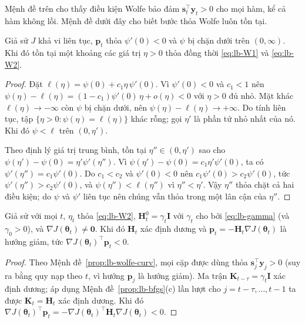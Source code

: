 Mệnh đề trên cho thấy điều kiện Wolfe bảo đảm $\mathbf{s}_t^{\top}\mathbf{y}_t>0$ cho mọi hàm, kể cả hàm không lồi. Mệnh đề dưới đây cho biết bước thỏa Wolfe luôn tồn tại.

\begin{proposition}\label{prop:lb-wolfe-exist}
Giả sử $J$ khả vi liên tục, $\mathbf{p}_t$ thỏa $\psi'(0)<0$ và $\psi$ bị chặn dưới trên $(0,\infty)$. Khi đó tồn tại một khoảng các giá trị $\eta>0$ thỏa đồng thời \eqref{eq:lb-W1} và \eqref{eq:lb-W2}.
\end{proposition}

\begin{proof}
Đặt $\ell(\eta)=\psi(0)+c_1\eta\,\psi'(0)$. Vì $\psi'(0)<0$ và $c_1<1$ nên $\psi(\eta)-\ell(\eta)=(1-c_1)\psi'(0)\,\eta+o(\eta)<0$ với $\eta>0$ đủ nhỏ. Mặt khác $\ell(\eta)\to-\infty$ còn $\psi$ bị chặn dưới, nên $\psi(\eta)-\ell(\eta)\to+\infty$. Do tính liên tục, tập $\{\eta>0:\psi(\eta)=\ell(\eta)\}$ khác rỗng; gọi $\eta'$ là phần tử nhỏ nhất của nó. Khi đó $\psi<\ell$ trên $(0,\eta')$.

Theo định lý giá trị trung bình, tồn tại $\eta''\in(0,\eta')$ sao cho $\psi(\eta')-\psi(0)=\eta'\psi'(\eta'')$. Vì $\psi(\eta')-\psi(0)=c_1\eta'\psi'(0)$, ta có $\psi'(\eta'')=c_1\psi'(0)$. Do $c_1<c_2$ và $\psi'(0)<0$ nên $c_1\psi'(0)>c_2\psi'(0)$, tức $\psi'(\eta'')>c_2\psi'(0)$, và $\psi(\eta'')<\ell(\eta'')$ vì $\eta''<\eta'$. Vậy $\eta''$ thỏa chặt cả hai điều kiện; do $\psi$ và $\psi'$ liên tục nên chúng vẫn thỏa trong một lân cận của $\eta''$.
\end{proof}

\begin{proposition}\label{prop:lb-descent}
Giả sử với mọi $t$, $\eta_t$ thỏa \eqref{eq:lb-W2}, $\mathbf{H}_t^{0}=\gamma_t\mathbf{I}$ với $\gamma_t$ cho bởi \eqref{eq:lb-gamma} (và $\gamma_0>0$), và $\nabla J(\boldsymbol{\theta}_t)\neq\mathbf{0}$. Khi đó $\mathbf{H}_t$ xác định dương và $\mathbf{p}_t=-\mathbf{H}_t\nabla J(\boldsymbol{\theta}_t)$ là hướng giảm, tức $\nabla J(\boldsymbol{\theta}_t)^{\top}\mathbf{p}_t<0$.
\end{proposition}

\begin{proof}
Theo Mệnh đề~\ref{prop:lb-wolfe-curv}, mọi cặp được dùng thỏa $\mathbf{s}_j^{\top}\mathbf{y}_j>0$ (suy ra bằng quy nạp theo $t$, vì hướng $\mathbf{p}_j$ là hướng giảm). Ma trận $\mathbf{K}_{t-\tau}=\gamma_t\mathbf{I}$ xác định dương; áp dụng Mệnh đề~\ref{prop:lb-bfgs}(c) lần lượt cho $j=t-\tau,\dots,t-1$ ta được $\mathbf{K}_t=\mathbf{H}_t$ xác định dương. Khi đó $\nabla J(\boldsymbol{\theta}_t)^{\top}\mathbf{p}_t=-\nabla J(\boldsymbol{\theta}_t)^{\top}\mathbf{H}_t\nabla J(\boldsymbol{\theta}_t)<0$.
\end{proof}

